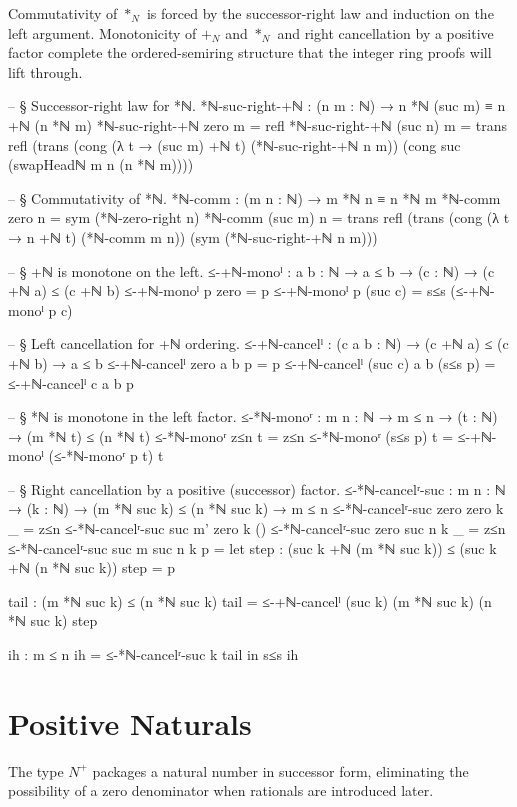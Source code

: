 \documentclass[11pt,a4paper]{book}
\def\mathbb#1{#1}%
\begin{document}
Commutativity of $*_{\mathbb{N}}$ is forced by the successor-right law and induction on the left argument.
Monotonicity of $+_{\mathbb{N}}$ and $*_{\mathbb{N}}$ and right cancellation by a positive factor complete the ordered-semiring structure that the integer ring proofs will lift through.

\begin{code}
-- § Successor-right law for *ℕ.
*ℕ-suc-right-+ℕ : (n m : ℕ) → n *ℕ (suc m) ≡ n +ℕ (n *ℕ m)
*ℕ-suc-right-+ℕ zero m = refl
*ℕ-suc-right-+ℕ (suc n) m =
  trans
    refl
    (trans
      (cong (λ t → (suc m) +ℕ t) (*ℕ-suc-right-+ℕ n m))
      (cong suc (swapHeadℕ m n (n *ℕ m))))

-- § Commutativity of *ℕ.
*ℕ-comm : (m n : ℕ) → m *ℕ n ≡ n *ℕ m
*ℕ-comm zero n = sym (*ℕ-zero-right n)
*ℕ-comm (suc m) n =
  trans
    refl
    (trans
      (cong (λ t → n +ℕ t) (*ℕ-comm m n))
      (sym (*ℕ-suc-right-+ℕ n m)))

-- § +ℕ is monotone on the left.
≤-+ℕ-monoˡ : {a b : ℕ} → a ≤ b → (c : ℕ) → (c +ℕ a) ≤ (c +ℕ b)
≤-+ℕ-monoˡ p zero = p
≤-+ℕ-monoˡ p (suc c) = s≤s (≤-+ℕ-monoˡ p c)

-- § Left cancellation for +ℕ ordering.
≤-+ℕ-cancelˡ : (c a b : ℕ) → (c +ℕ a) ≤ (c +ℕ b) → a ≤ b
≤-+ℕ-cancelˡ zero a b p = p
≤-+ℕ-cancelˡ (suc c) a b (s≤s p) = ≤-+ℕ-cancelˡ c a b p

-- § *ℕ is monotone in the left factor.
≤-*ℕ-monoʳ : {m n : ℕ} → m ≤ n → (t : ℕ) → (m *ℕ t) ≤ (n *ℕ t)
≤-*ℕ-monoʳ z≤n t = z≤n
≤-*ℕ-monoʳ (s≤s p) t = ≤-+ℕ-monoˡ (≤-*ℕ-monoʳ p t) t

-- § Right cancellation by a positive (successor) factor.
≤-*ℕ-cancelʳ-suc : {m n : ℕ} → (k : ℕ) → (m *ℕ suc k) ≤ (n *ℕ suc k) → m ≤ n
≤-*ℕ-cancelʳ-suc {zero} {zero} k _ = z≤n
≤-*ℕ-cancelʳ-suc {suc m'} {zero} k ()
≤-*ℕ-cancelʳ-suc {zero} {suc n} k _ = z≤n
≤-*ℕ-cancelʳ-suc {suc m} {suc n} k p =
  let
    step : (suc k +ℕ (m *ℕ suc k)) ≤ (suc k +ℕ (n *ℕ suc k))
    step = p

    tail : (m *ℕ suc k) ≤ (n *ℕ suc k)
    tail = ≤-+ℕ-cancelˡ (suc k) (m *ℕ suc k) (n *ℕ suc k) step

    ih : m ≤ n
    ih = ≤-*ℕ-cancelʳ-suc k tail
  in
  s≤s ih
\end{code}

\section{Positive Naturals}

The type $\mathbb{N}^+$ packages a natural number in successor form, eliminating
the possibility of a zero denominator when rationals are introduced later.
\end{document}
